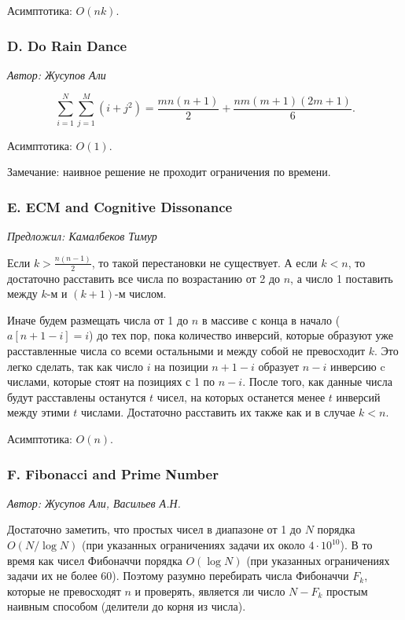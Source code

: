 \documentclass[11pt, a4paper]{article}
\newcommand{\problemauthor}[1]{
\begin{flushright}
\textit{Автор: #1}
\end{flushright}
}
\newcommand{\problemofferer}[1]{
\begin{flushright}
\textit{Предложил: #1}
\end{flushright}
}
\begin{document}
Асимптотика: $O(n k)$.



\subsubsection*{D. Do Rain Dance} 

\problemauthor{Жусупов Али}

$$\sum_{i=1}^{N} \sum_{j=1}^{M} (i + j^2) = \frac{m n (n+1)}{2} + \frac{n m (m+1) (2m+1)}{6}.$$

Асимптотика: $O(1)$.

Замечание: наивное решение не проходит ограничения по времени.



\subsubsection*{E. ECM and Cognitive Dissonance} 

\problemofferer{Камалбеков Тимур}

Если $k > \frac{n (n-1)}{2}$, то такой перестановки не существует. А если $k < n$, то достаточно расставить все числа по возрастанию от 2 до $n$, а число 1 поставить между $k$-м и $(k+1)$-м числом. 

Иначе будем размещать числа от 1 до $n$ в массиве с конца в начало ($a[n + 1 - i] = i$) до тех пор, пока количество инверсий, которые образуют уже расставленные числа со всеми остальными и между собой не превосходит $k$. Это легко сделать, так как число $i$ на позиции $n + 1 - i$ образует $n-i$ инверсию c числами, которые стоят на позициях с 1 по $n - i$. После того, как данные числа будут расставлены останутся $t$ чисел, на которых останется менее $t$ инверсий между этими $t$ числами. Достаточно расставить их также как и в случае $k < n$.

Асимптотика: $O(n)$.



\subsubsection*{F. Fibonacci and Prime Number} 

\problemauthor{Жусупов Али, Васильев А.Н.}

Достаточно заметить, что простых чисел в диапазоне от 1 до $N$ порядка $O(N / \log{N})$ (при указанных ограничениях задачи их около $4\cdot 10^{10}$). В то время как чисел Фибоначчи порядка $O(\log{N})$ (при указанных ограничениях задачи их не более 60). Поэтому разумно перебирать числа Фибоначчи $F_k$, которые не превосходят $n$ и проверять, является ли число $N - F_k$ простым наивным способом (делители до корня из числа).
\end{document}

